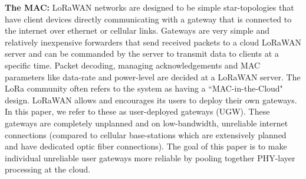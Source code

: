 \vspace*{0.02in}

\noindent \textbf{The MAC: }  LoRaWAN networks
are designed to be simple star-topologies that have client devices directly
communicating with a gateway that is connected to the internet over ethernet
or cellular links. Gateways are very simple and relatively inexpensive forwarders that send received packets to a cloud LoRaWAN server and can be commanded by the server to transmit data to clients at a specific time. Packet decoding, managing acknowledgements and
MAC parameters like data-rate and power-level are decided at a LoRaWAN
server. The LoRa community often refers to the system as having a
``MAC-in-the-Cloud" design. LoRaWAN allows and encourages its users to deploy their own gateways. In this
paper, we refer to these as user-deployed gateways (UGW). These gateways are
completely unplanned and on low-bandwidth, unreliable internet connections
(compared to cellular base-stations which are extensively planned and have
dedicated optic fiber connections). The goal of this paper is to make individual unreliable user gateways more reliable by pooling together PHY-layer processing at the cloud.  




